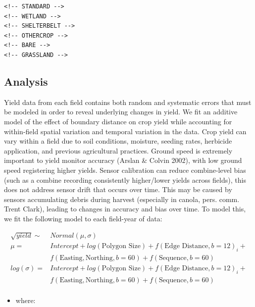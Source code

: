 \documentclass[]{elsarticle} %
\providecommand{\tightlist}{%
  \setlength{\itemsep}{0pt}\setlength{\parskip}{0pt}}
\begin{document}
\begin{verbatim}
<!-- STANDARD -->
<!-- WETLAND -->
<!-- SHELTERBELT -->
<!-- OTHERCROP -->
<!-- BARE -->
<!-- GRASSLAND -->
\end{verbatim}

\hypertarget{analysis}{%
\subsection{Analysis}\label{analysis}}

Yield data from each field contains both random and systematic errors that must be modeled in order to reveal underlying changes in yield.
We fit an additive model of the effect of boundary distance on crop yield while accounting for within-field spatial variation and temporal variation in the data.
Crop yield can vary within a field due to soil conditions, moisture, seeding rates, herbicide application, and previous agricultural practices.
Ground speed is extremely important to yield monitor accuracy (Arslan \& Colvin 2002), with low ground speed registering higher yields.
Sensor calibration can reduce combine-level bias (such as a combine recording consistently higher/lower yields across fields), this does not address sensor drift that occurs over time.
This may be caused by sensors accumulating debris during harvest (especially in canola, pers. comm. Trent Clark), leading to changes in accuracy and bias over time.
To model this, we fit the following model to each field-year of data:

\begin{equation}
  \begin{split}
  \sqrt{yield} \sim & Normal (\mu, \sigma)\\
  \mu = & Intercept + log(\text{Polygon Size}) + f(\text{Edge Distance}, b=12)_i + \\
   & f(\text{Easting}, \text{Northing}, b=60) + f(\text{Sequence}, b=60) \\
  log(\sigma) =  & Intercept + log(\text{Polygon Size}) + f(\text{Edge Distance}, b=12)_i + \\
   & f(\text{Easting}, \text{Northing}, b=60) + f(\text{Sequence}, b=60) \\
  \end{split}
  \end{equation}

\begin{itemize}
\tightlist
\item
  where:
\end{itemize}
\end{document}
